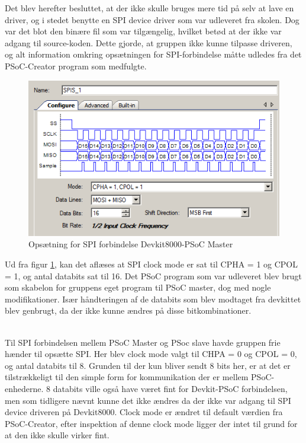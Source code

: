 Det blev herefter besluttet, at der ikke skulle bruges mere tid på selv at lave en driver, og i stedet benytte en SPI device driver som var udleveret fra skolen.
Dog var det blot den binære fil som var tilgængelig, hvilket betød at der ikke var adgang til source-koden. Dette gjorde, at gruppen ikke kunne tilpasse driveren,
og alt information omkring opsætningen for SPI-forbindelse måtte udledes fra det PSoC-Creator program som medfulgte. 

\begin{figure}[H]
	\centerline{\includegraphics[scale=0.8]{tex/Design/SPI/Clock_mode_SPI}}
	\caption{Opsætning for SPI forbindelse Devkit8000-PSoC Master}
	\label{SPI_opsaetning}
\end{figure}

Ud fra figur \ref{SPI_opsaetning}, kan det aflæses at SPI clock mode er sat til CPHA = 1 og CPOL = 1, og antal databits sat til 16. Det PSoC program som var 
udleveret blev brugt som skabelon for gruppens eget program til PSoC master, dog med nogle modifikationer. Især håndteringen af de databits som blev modtaget 
fra devkittet blev genbrugt, da der ikke kunne ændres på disse bitkombinationer.

\\
Til SPI forbindelsen mellem PSoC Master og PSoc slave havde gruppen frie hænder til opsætte SPI. Her blev clock mode valgt til CHPA = 0 og CPOL = 0, og 
antal databits til 8. Grunden til der kun bliver sendt 8 bits her, er at det er tilstrækkeligt til den simple form for kommunikation der er mellem PSoC-enhederne.
8 databits ville også have været fint for Devkit-PSoC forbindelsen, men som tidligere nævnt kunne det ikke ændres da der ikke var adgang til SPI device driveren
på Devkit8000. Clock mode er ændret til default værdien fra PSoC-Creator, efter inspektion af denne clock mode ligger der intet til grund for at den ikke
skulle virker fint. 
